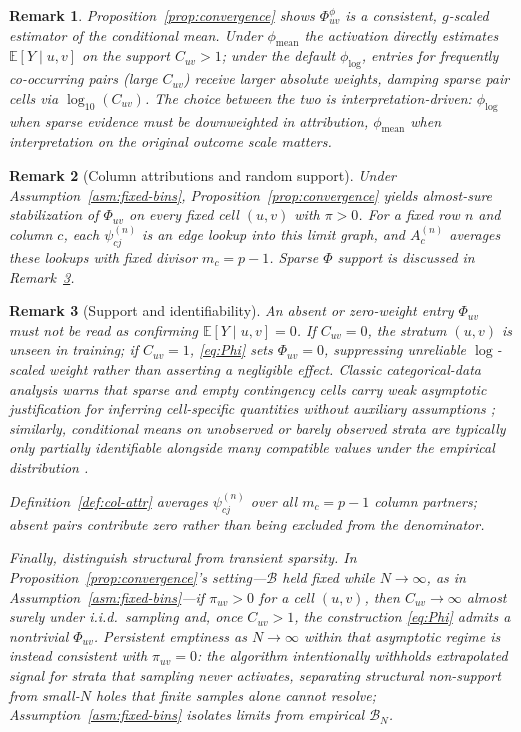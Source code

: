 \documentclass[11pt]{article}
\newtheorem{remark}{Remark}
\begin{document}
\begin{remark}
Proposition~\ref{prop:convergence} shows $\Phi^\phi_{uv}$ is a consistent, $g$-scaled estimator of the conditional mean.
Under $\phi_{\mathrm{mean}}$ the activation directly estimates $\mathbb{E}[Y \mid u,v]$ on the support $C_{uv} > 1$; under the default $\phi_{\log}$, entries for frequently co-occurring pairs (large $C_{uv}$) receive larger absolute weights, damping sparse pair cells via $\log_{10}(C_{uv})$.
The choice between the two is interpretation-driven: $\phi_{\log}$ when sparse evidence must be downweighted in attribution, $\phi_{\mathrm{mean}}$ when interpretation on the original outcome scale matters.
\end{remark}

\begin{remark}[Column attributions and random support]
\label{rem:conv-col}
Under Assumption~\ref{asm:fixed-bins}, Proposition~\ref{prop:convergence} yields almost-sure stabilization of $\Phi_{uv}$ on every fixed cell $(u,v)$ with $\pi>0$.
For a fixed row $n$ and column $c$, each $\psi_{cj}^{(n)}$ is an edge lookup into this limit graph, and $A_c^{(n)}$ averages these lookups with fixed divisor $m_c = p-1$.
Sparse $\Phi$ support is discussed in Remark~\ref{rem:support}.
\end{remark}

\begin{remark}[Support and identifiability]
\label{rem:support}
An absent or zero-weight entry $\Phi_{uv}$ must not be read as confirming $\mathbb{E}[Y \mid u,v]=0$.
If $C_{uv}=0$, the stratum $(u,v)$ is unseen in training; if $C_{uv}=1$, \eqref{eq:Phi} sets $\Phi_{uv}=0$, suppressing unreliable $\log$-scaled weight rather than asserting a negligible effect.
Classic categorical-data analysis warns that sparse and empty contingency cells carry weak asymptotic justification for inferring cell-specific quantities without auxiliary assumptions \cite{Agresti2013}; similarly, conditional means on unobserved or barely observed strata are typically only \emph{partially identifiable} alongside many compatible values under the empirical distribution \cite{Manski2003}.

Definition~\ref{def:col-attr} averages $\psi_{cj}^{(n)}$ over all $m_c = p-1$ column partners; absent pairs contribute zero rather than being excluded from the denominator.

Finally, distinguish structural from transient sparsity.
In Proposition~\ref{prop:convergence}'s setting---$\mathcal{B}$ held fixed while $N\to\infty$, as in Assumption~\ref{asm:fixed-bins}---if $\pi_{uv}>0$ for a cell $(u,v)$, then $C_{uv}\to\infty$ almost surely under i.i.d.\ sampling and, once $C_{uv}>1$, the construction \eqref{eq:Phi} admits a nontrivial $\Phi_{uv}$.
Persistent emptiness as $N\to\infty$ within that asymptotic regime is instead consistent with $\pi_{uv}=0$: the algorithm intentionally withholds extrapolated signal for strata that sampling never activates, separating structural non-support from small-$N$ holes that finite samples alone cannot resolve; Assumption~\ref{asm:fixed-bins} isolates limits from empirical $\mathcal{B}_N$.
\end{remark}
\end{document}
